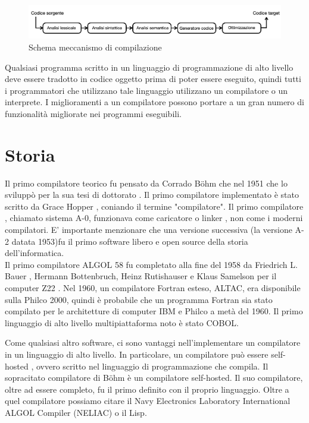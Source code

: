 \documentclass[12pt,a4paper]{report}
\begin{document}
\begin{figure}
\includegraphics[width = \textwidth]{SchemaCompilatore.png}
\caption{Schema meccanismo di compilazione}
\label{Fig:MeccanismoCompilazione}
\end{figure}


Qualsiasi programma scritto in un linguaggio di programmazione di alto livello deve essere tradotto in codice oggetto prima di poter essere eseguito, quindi tutti i programmatori che utilizzano tale linguaggio utilizzano un compilatore o un interprete. I miglioramenti a un compilatore possono portare a un gran numero di funzionalità migliorate nei programmi eseguibili.

\section{Storia}
Il primo compilatore teorico fu pensato da Corrado Böhm che nel 1951 che lo sviluppò per la sua tesi di dottorato . Il primo compilatore implementato è stato scritto da Grace Hopper , coniando il termine "compilatore". Il primo compilatore , chiamato sistema A-0,  funzionava come caricatore o linker , non come i moderni compilatori. E' importante menzionare che una versione successiva (la versione A-2 datata 1953)fu il primo software libero e open source della storia dell'informatica. \\

Il primo compilatore ALGOL 58 fu completato alla fine del 1958 da Friedrich L. Bauer , Hermann Bottenbruch, Heinz Rutishauser e Klaus Samelson per il computer Z22 . 
Nel 1960, un compilatore Fortran esteso, ALTAC, era disponibile sulla Philco 2000, quindi è probabile che un programma Fortran sia stato compilato per le architetture di computer IBM e Philco a metà del 1960.  Il primo linguaggio di alto livello multipiattaforma noto è stato COBOL. 

Come qualsiasi altro software, ci sono vantaggi nell'implementare un compilatore in un linguaggio di alto livello. In particolare, un compilatore può essere self-hosted , ovvero scritto nel linguaggio di programmazione che compila. Il sopracitato compilatore di Böhm è un compilatore self-hosted. Il suo compilatore, oltre ad essere completo, fu il primo definito con il proprio linguaggio.
Oltre a quel compilatore possiamo citare il Navy Electronics Laboratory International ALGOL Compiler (NELIAC) o il Lisp.\\
\end{document}
